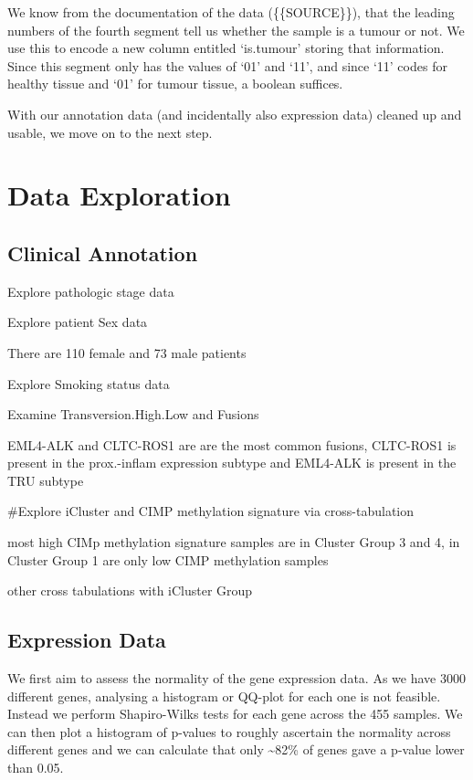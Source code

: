 \documentclass[
]{article}
\begin{document}
We know from the documentation of the data (\{\{SOURCE\}\}), that the
leading numbers of the fourth segment tell us whether the sample is a
tumour or not. We use this to encode a new column entitled `is.tumour'
storing that information. Since this segment only has the values of `01'
and `11', and since `11' codes for healthy tissue and `01' for tumour
tissue, a boolean suffices.

With our annotation data (and incidentally also expression data) cleaned
up and usable, we move on to the next step.

\section{Data Exploration}\label{data-exploration}

\subsection{Clinical Annotation}\label{clinical-annotation}

Explore pathologic stage data

Explore patient Sex data

There are 110 female and 73 male patients

Explore Smoking status data

Examine Transversion.High.Low and Fusions

EML4-ALK and CLTC-ROS1 are are the most common fusions, CLTC-ROS1 is
present in the prox.-inflam expression subtype and EML4-ALK is present
in the TRU subtype

\#Explore iCluster and CIMP methylation signature via cross-tabulation

most high CIMp methylation signature samples are in Cluster Group 3 and
4, in Cluster Group 1 are only low CIMP methylation samples

other cross tabulations with iCluster Group

\subsection{Expression Data}\label{expression-data}

We first aim to assess the normality of the gene expression data. As we
have 3000 different genes, analysing a histogram or QQ-plot for each one
is not feasible. Instead we perform Shapiro-Wilks tests for each gene
across the 455 samples. We can then plot a histogram of p-values to
roughly ascertain the normality across different genes and we can
calculate that only \textasciitilde82\% of genes gave a p-value lower
than 0.05.
\end{document}
